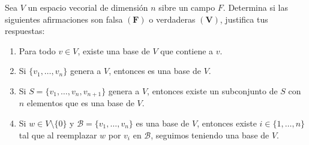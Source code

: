 \documentclass[12pt,a4paper]{article}
\begin{document}
    \begin{mdframed}[style=mdbluebox,frametitle={Ejercicio 4}]
        Sea $V$ un espacio vecorial de dimensión $n$ sibre un campo $F$. Determina si las siguientes
        afirmaciones son falsa $(\textbf{F})$ o verdaderas $(\textbf{V})$, justifica tus respuestas:
        \begin{enumerate}
            \item[(a)] Para todo $v\in V$, existe una base de $V$ que contiene a $v$.
            \item[(b)] Si $\{v_{1},\dots,v_{n}\}$ genera a $V$, entonces es una base de $V$.
            \item[(c)] Si $S=\{v_{1},\dots,v_{n},v_{n+1}\}$ genera a $V$, entonces existe un subconjunto de $S$ con $n$ elementos
            que es una base de $V$.
            \item[(d)] Si $w\in V\setminus\{0\}$ y $\mathcal{B}=\{v_{1},\dots,v_{n}\}$ es una base de $V$, entonces
            existe $i\in\{1,\dots,n\}$ tal que al reemplazar $w$ por $v_{i}$ en $\mathcal{B}$, seguimos teniendo una base
            de $V$. 
        \end{enumerate}
    \end{mdframed}
\end{document}
